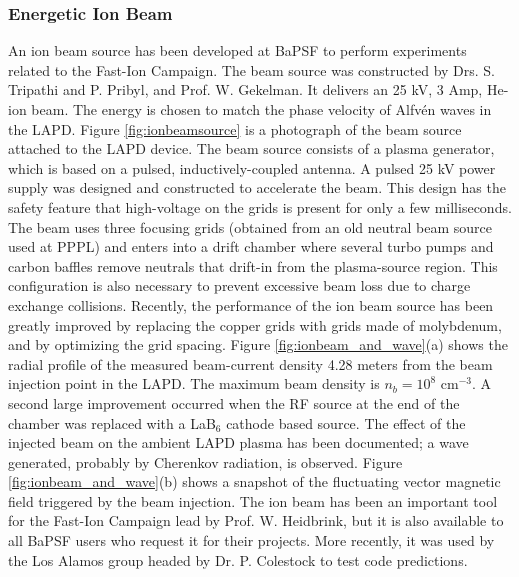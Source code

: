 \documentclass[11pt]{article}
\begin{document}
\subsubsection{Energetic Ion Beam}
An ion beam source has been developed at BaPSF to perform experiments related to the Fast-Ion Campaign.  The beam source was constructed by Drs. S. Tripathi and P. Pribyl, and Prof. W. Gekelman.  It delivers an 25 kV, 3 Amp, He-ion beam.  The energy is chosen to match the phase velocity of Alfv\'{e}n waves in the LAPD.  Figure \ref{fig:ionbeamsource} is a photograph of the beam source attached to the LAPD device.  The beam source consists of a plasma generator, which is based on a pulsed, inductively-coupled antenna.  A pulsed 25 kV power supply was designed and constructed to accelerate the beam.  This design has the safety feature that high-voltage on the grids is present for only a few milliseconds. 
 The beam uses three focusing grids (obtained from an old neutral beam source used at PPPL) and enters into a drift chamber where several turbo pumps and carbon baffles remove neutrals that drift-in from the plasma-source region.  This configuration is also necessary to prevent excessive beam loss due to charge exchange collisions.
	Recently, the performance of the ion beam source has been greatly improved by replacing the copper grids with grids made of molybdenum, and by optimizing the grid spacing.  Figure \ref{fig:ionbeam_and_wave}(a) shows the radial profile of the measured beam-current density 4.28 meters from the beam injection point in the LAPD.  The maximum beam density is $n_{b} = 10^{8}$ cm$^{-3}$. A second large  improvement occurred when the RF source at the end of the chamber was replaced with a LaB$_{6}$ cathode based source.
The effect of the injected beam on the ambient LAPD plasma has been documented; a wave generated, probably by Cherenkov radiation, is observed. Figure \ref{fig:ionbeam_and_wave}(b) shows a snapshot of the fluctuating vector magnetic field triggered by the beam injection.  The ion beam has been an important tool for the Fast-Ion Campaign lead by Prof. W. Heidbrink, but it is also available to all BaPSF users who request it for their projects.   More recently, it was used by the Los Alamos group headed by Dr. P. Colestock to test code predictions.
\end{document}
